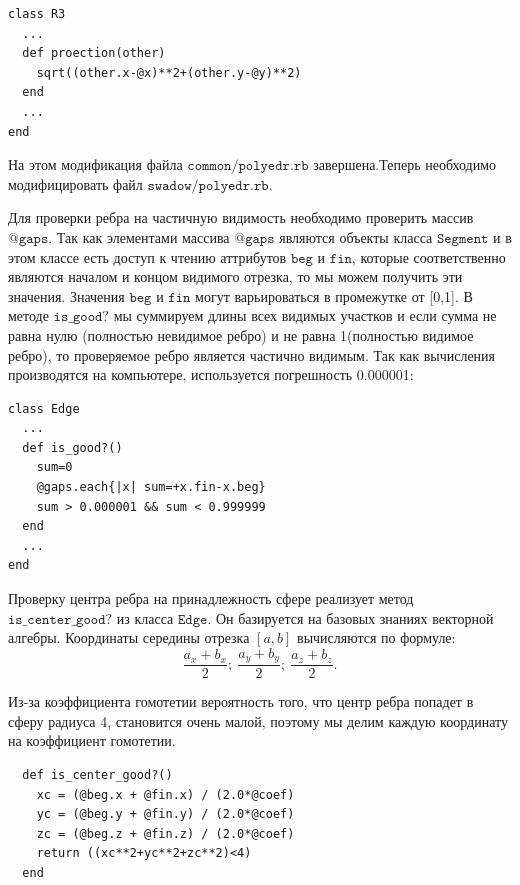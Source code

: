\newpage
\begin{small}
\begin{verbatim}
class R3
  ...
  def proection(other)
    sqrt((other.x-@x)**2+(other.y-@y)**2)
  end
  ...
end
\end{verbatim}
\end{small}

На этом модификация файла $\texttt{common/polyedr.rb}$ завершена.Теперь необходимо модифицировать файл $\texttt{swadow/polyedr.rb}$.

  Для проверки ребра на частичную видимость необходимо проверить массив $\texttt{@gaps}$. Так как элементами массива $\texttt{@gaps}$ являются объекты класса $\texttt{Segment}$ и в этом классе есть доступ к чтению аттрибутов $\texttt{beg}$ и $\texttt{fin}$, которые соответственно являются началом и концом видимого отрезка, то мы можем получить эти значения. Значения  $\texttt{beg}$ и $\texttt{fin}$ могут варьироваться в промежутке от [0,1]. В методе $\texttt{is\_good?}$ мы суммируем длины всех видимых участков и если сумма не равна нулю (полностью невидимое ребро) и не равна 1(полностью видимое ребро), то проверяемое ребро является частично видимым. Так как вычисления производятся на компьютере, используется погрешность 0.000001:

\begin{small}
\begin{verbatim}
class Edge 
  ...
  def is_good?()
    sum=0
    @gaps.each{|x| sum=+x.fin-x.beg}
    sum > 0.000001 && sum < 0.999999
  end
  ...
end
\end{verbatim}
\end{small}

  Проверку центра ребра на принадлежность сфере реализует метод  $\texttt{is\_center\_good?}$ из класса $\texttt{Edge}$. Он базируется на базовых знаниях векторной алгебры. Координаты середины отрезка $[ \mathit a, \mathit b ]$ вычисляются по формуле: 
$$\frac{a_{x}+b_{x}}{2};~\frac{a_{y}+b_{y}}{2};~ \frac{a_{z}+b_{z}}{2}.$$

Из-за коэффициента гомотетии вероятность того, что центр ребра попадет в сферу радиуса 4, становится очень малой, поэтому мы делим каждую координату на коэффициент гомотетии.
\begin{small}
\begin{verbatim} 
  def is_center_good?()
    xc = (@beg.x + @fin.x) / (2.0*@coef)
    yc = (@beg.y + @fin.y) / (2.0*@coef)
    zc = (@beg.z + @fin.z) / (2.0*@coef)
    return ((xc**2+yc**2+zc**2)<4)
  end
\end{verbatim}
\end{small}

